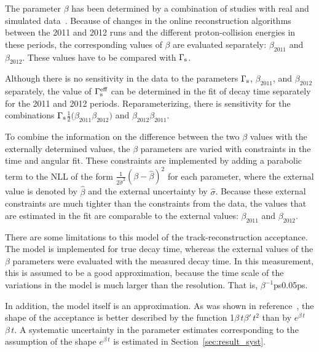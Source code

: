 The parameter $\beta$ has been determined by a combination of studies with real and simulated data~\cite{LHCb-ANA-2014-039}. Because of
changes in the online reconstruction algorithms between the 2011 and 2012 runs and the different proton-collision energies in these
periods, the corresponding values of $\beta$ are evaluated separately: $\beta_\text{2011}$\texteq\mbox{\unitsp\invps}
and $\beta_\text{2012}$\texteq\mbox{\unitsp\invps}. These values have to be compared with
$\Gamma_\text{s}$\unitsp\invps.

Although there is no sensitivity in the \BstoJpsiKK{} data to the parameters $\Gamma_\text{s}$, $\beta_\text{2011}$, and $\beta_\text{2012}$
separately, the value of $\Gamma_\text{s}^\text{eff}$ can be determined in the fit of decay time separately for the 2011 and 2012 periods.
Reparameterizing, there is sensitivity for the combinations $\Gamma_\text{s}$\textminus$\tfrac{1}{2}(\beta_\text{2011}$\textplus$\beta_\text{2012})$
and $\beta_\text{2012}$\textminus$\beta_\text{2011}$.

To combine the information on the difference between the two $\beta$ values with the externally determined values, the $\beta$ parameters
are varied with constraints in the time and angular fit. These constraints are implemented by adding a parabolic term to the NLL of the
form $\frac{1}{2\hat{\sigma}^2}(\beta-\hat{\beta})^2$ for each parameter, where the external value is denoted by $\hat{\beta}$ and the
external uncertainty by $\hat{\sigma}$. Because these external constraints are much tighter than the constraints from the \BstoJpsiKK{}
data, the values that are estimated in the fit are comparable to the external values:
$\beta_\text{2011}$\texteq\mbox{\unitsp\invps} and
$\beta_\text{2012}$\texteq\mbox{\unitsp\invps}.

There are some limitations to this model of the track-reconstruction acceptance. The model is implemented for true decay time, whereas the
external values of the $\beta$ parameters were evaluated with the measured decay time. In this measurement, this is assumed to be a good
approximation, because the time scale of the variations in the model is much larger than the resolution. That is,
$\beta^{-1}$\textapprox\mbox{\unitsp{}ps}\textgg\mbox{0.05\unitsp{}ps}.

In addition, the model itself is an approximation. As was shown in reference~\cite{LHCb-ANA-2014-039}, the shape of the acceptance is
better described by the function 1\textplus$\beta\,t$\textplus$\beta'\,t^2$ than by $e^{\beta\,t}$\textplus$\beta\,t$. A
systematic uncertainty in the parameter estimates corresponding to the assumption of the shape $e^{\beta\,t}$ is estimated in
Section~\ref{sec:result_syst}.

